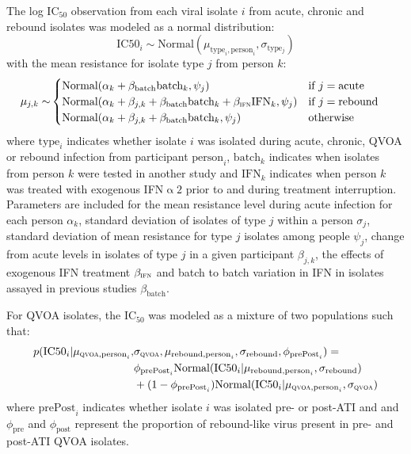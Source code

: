 \documentclass[12pt]{article}
\newcommand{\ifna}{IFN\hspace{-.08em}${\upalpha 2}$}
\newcommand{\icFifty}{IC$_{50}$}
\begin{document}
  The log \icFifty{} observation from each viral isolate $i$ from acute, chronic and rebound isolates was modeled as a normal distribution:
  \[\text{IC50}_i\sim\text{Normal}(\mu_{\text{type}_i,\text{person}_i},\sigma_\text{type$_j$})\]
  with the mean resistance for isolate type $j$ from person $k$:
  \begin{align*}
    \mu_{j,k}\sim&\begin{cases}
      \text{Normal}(\alpha_{k}+\beta_{\text{batch}}\text{batch}_k,\psi_j) & \text{if } j=\text{acute}\\
      \text{Normal}(\alpha_{k}+\beta_{j,k}+\beta_{\text{batch}}\text{batch}_k+\beta_{\text{\textsc{ifn}}}\text{IFN}_{k},\psi_j) & \text{if } j=\text{rebound}\\
      \text{Normal}(\alpha_{k}+\beta_{j,k}+\beta_{\text{batch}}\text{batch}_k,\psi_j) & \text{otherwise}
    \end{cases}
  \end{align*}
  where $\text{type}_i$ indicates whether isolate $i$ was isolated during acute, chronic, QVOA or rebound infection from participant $\text{person}_i$, $\text{batch}_k$ indicates when isolates from person $k$ were tested in another study and $\text{IFN}_k$ indicates when person $k$ was treated with exogenous \ifna{} prior to and during treatment interruption. Parameters are included for the mean resistance level during acute infection for each person $\alpha_k$, standard deviation of isolates of type $j$ within a person $\sigma_j$, standard deviation of mean resistance for type $j$ isolates among people $\psi_j$, change from acute levels in isolates of type $j$ in a given participant $\beta_{j,k}$, the effects of exogenous IFN treatment $\beta_{\textsc{ifn}}$ and batch to batch variation in IFN in isolates assayed in previous studies $\beta_{\text{batch}}$. 


  For QVOA isolates, the \icFifty{} was modeled as a mixture of two populations such that:
  \[
  \begin{split}
    p(\text{IC50}_i|\mu_{\text{\textsc{qvoa}},\text{person}_i},&\sigma_{\text{\textsc{qvoa}}},\mu_{\text{rebound},\text{person}_i},\sigma_{\text{rebound}},\phi_{\text{prePost}_i})=\\
    &\phi_{\text{prePost}_i}\text{Normal}(\text{IC50}_i|\mu_{\text{rebound},\text{person}_i},\sigma_{\text{rebound}})\\
    &+ (1-\phi_{\text{prePost}_i})\text{Normal}(\text{IC50}_i|\mu_{\text{\textsc{qvoa}},\text{person}_i},\sigma_{\text{\textsc{qvoa}}}) 
  \end{split}
  \]
  where $\text{prePost}_i$ indicates whether isolate $i$ was isolated  pre- or post-ATI and and $\phi_\text{pre}$ and $\phi_\text{post}$ represent the proportion of rebound-like virus present in pre- and post-ATI QVOA isolates.
\end{document}
